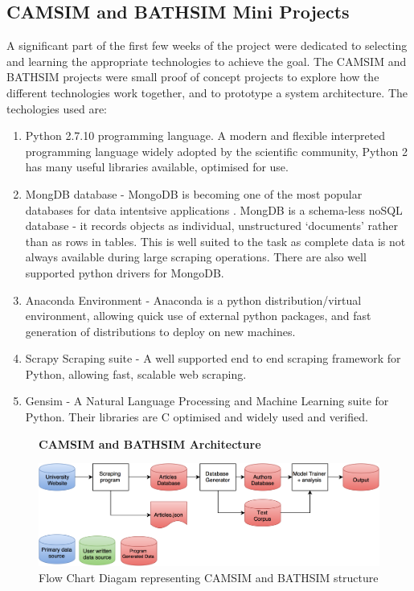 \documentclass[11pt, oneside]{article}   	%
\begin{document}
\subsection{CAMSIM and BATHSIM Mini Projects}
\label{sec:CAMSIM}
A significant part of the first few weeks of the project were dedicated to selecting and learning the appropriate technologies to achieve the goal. The CAMSIM and BATHSIM projects were small proof of concept projects to explore how the different technologies work together, and to prototype a system architecture.
The techologies used are:
\begin{enumerate}
\item Python 2.7.10 programming language. A modern and flexible interpreted programming language widely adopted by the scientific community, Python 2 has many useful libraries available, optimised for use.
\item MongDB database - MongoDB is becoming one of the most popular databases for data intentsive applications \cite{BIGMONGO}. MongDB is a schema-less noSQL database - it records objects as individual, unstructured `documents' rather than as rows in tables. This is well suited to the task as complete data is not always available during large scraping operations. There are also well supported python drivers for MongoDB. 
\item Anaconda Environment - Anaconda is a python distribution/virtual environment, allowing quick use of external python packages, and fast generation of distributions to deploy on new machines.
\item Scrapy Scraping suite - A well supported end to end scraping framework for Python, allowing fast, scalable web scraping. 
\item Gensim - A Natural Language Processing and Machine Learning suite for Python. Their libraries are C optimised and widely used and verified.
\end{enumerate}

\begin{figure}
    \centering
    \textbf{CAMSIM and BATHSIM Architecture}\par\medskip
    \includegraphics[scale=0.23]{CAMSIM.png}
    \caption{Flow Chart Diagam representing CAMSIM and BATHSIM structure \label{fig:CAMSIM}}
\end{figure}
\end{document}
